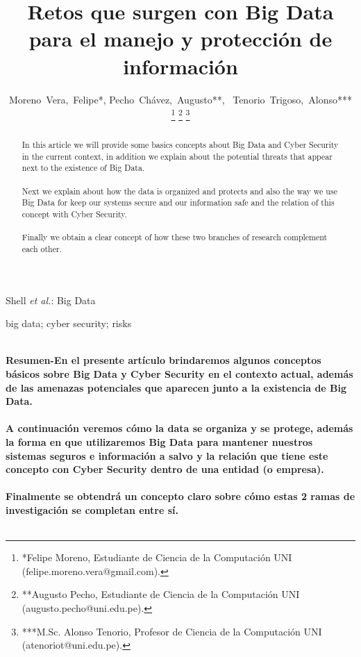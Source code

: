 \documentclass[journal]{IEEEtran}
\begin{document}
%
\title{Retos que surgen con Big Data para el manejo y protección de información }

\author{Moreno~Vera,~Felipe*,\IEEEmembership{}
        Pecho~Chávez,~Augusto**,~\IEEEmembership{}
     	Tenorio~Trigoso,~Alonso***
\IEEEmembership{}
\thanks{*Felipe Moreno, Estudiante de Ciencia de la Computación UNI (felipe.moreno.vera@gmail.com). }
\thanks{**Augusto Pecho, Estudiante de Ciencia de la Computación UNI (augusto.pecho@uni.edu.pe). }
\thanks{***M.Sc. Alonso Tenorio, Profesor de Ciencia de la Computación UNI (atenoriot@uni.edu.pe). }
}


%
{Shell \MakeLowercase{\textit{et al.}}: Big Data}


\maketitle


\begin{abstract}
In this article we will provide some basics concepts about Big Data and Cyber Security in the current context, in addition we explain about the potential threats that appear next to the existence of Big Data.\\ \\
Next we explain about how the data is organized and protects and also the way we use Big Data for keep our systems secure and our information safe and the relation of this concept with Cyber Security.\\ \\
Finally we obtain a clear concept of how these two branches of research complement each other.\\

\end{abstract}


\begin{IEEEkeywords}
big data; cyber security; risks\\ \\
\end{IEEEkeywords}

\textbf{Resumen-En el presente artículo brindaremos algunos conceptos básicos sobre Big Data y Cyber Security en el contexto actual, además de las amenazas potenciales que aparecen junto a la existencia de Big Data.\\ \\
A continuación veremos cómo la data se organiza y se protege, además la forma en que utilizaremos Big Data para mantener nuestros sistemas seguros e información a salvo y la relación que tiene este concepto con Cyber Security dentro de una entidad (o empresa).\\ \\ 
Finalmente se obtendrá un concepto claro sobre cómo estas 2 ramas de investigación se completan entre sí.}\\ \\
\end{document}
